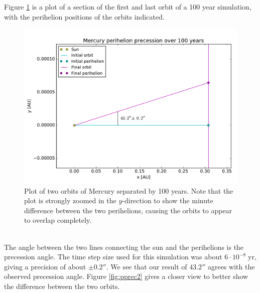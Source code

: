 \documentclass{article}
\begin{document}
Figure \ref{fig:pprec} is a plot of a section of the first and last orbit of a 100 year simulation, with the perihelion positions of the orbits indicated. \\
\begin{figure}[!h]
    \centering
    \includegraphics[width=\linewidth]{perihelion_precession.pdf}
    \caption{Plot of two orbits of Mercury separated by 100 years. Note that the plot is strongly zoomed in the $y$-direction to show the minute difference between the two perihelions, causing the orbits to appear to overlap completely.}
    \label{fig:pprec}
\end{figure}\\
The angle between the two lines connecting the sun and the perihelions is the precession angle. The time step size used for this simulation was about $6\cdot 10^{-8}\;\text{yr}$, giving a precision of about $\pm 0.2''$. We see that our result of $43.2''$ agrees with the observed precession angle. Figure \ref{fig:pprec2} gives a closer view to better show the difference between the two orbits. \\
\end{document}
